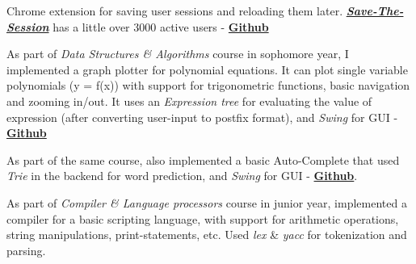 


\begin{cventries}
  \minprojentry
    {
      \begin{cvitems} %
        \item {Chrome extension for saving user sessions and reloading them later. \newline
        \textit{\textbf{\href{https://chrome.google.com/webstore/detail/save-the-session/gfokkgedgncpmhnbomipnbnpkedjpbil}{Save-The-Session}}} has a little over 3000 active users \enspace - \enspace 
        {\textbf{\href{https://github.com/sg1993/Save-The-Session}{Github}}}}
      \end{cvitems}
    }
  \minprojentry
    {
      \begin{cvitems} %
        \item {As part of \textit{Data Structures \& Algorithms} course in sophomore year, I implemented a graph plotter for polynomial equations. It can plot single variable polynomials (y = f(x)) with support for trigonometric functions, basic navigation and zooming in/out. It uses an \textit{Expression tree} for evaluating the value of expression (after converting user-input to postfix format), and \textit{Swing} for GUI \enspace - \enspace 
        {\textbf{\href{https://github.com/sg1993/BasicPlotter}{Github}}}}
      \end{cvitems}
    }
  \minprojentry
    {
      \begin{cvitems} %
        \item {As part of the same course, also implemented a basic Auto-Complete that used \textit{Trie} in the backend for word prediction, and \textit{Swing} for GUI \enspace - \enspace 
        {\textbf{\href{https://github.com/sg1993/AutoComplete}{Github}}}.}
      \end{cvitems}
    }
  \minprojentry
    {
      \begin{cvitems} %
        \item {As part of \textit{Compiler \& Language processors} course in junior year, implemented a compiler for a basic scripting language, with support for arithmetic operations, string manipulations, print-statements, etc. Used \textit{lex} \& \textit{yacc} for tokenization and parsing.}
      \end{cvitems}
    }

\end{cventries}


